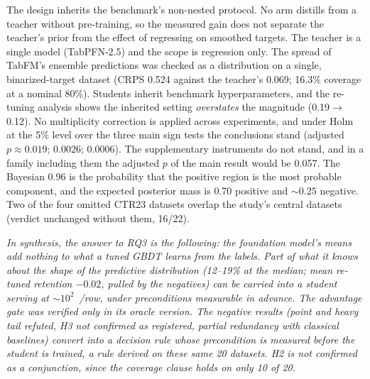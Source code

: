The design inherits the benchmark's non-nested protocol. No arm
distills from a teacher without pre-training, so the measured gain
does not separate the teacher's prior from the effect of regressing
on smoothed targets. The teacher is a single model (TabPFN-2.5) and
the scope is regression only. The spread of TabFM's ensemble
predictions was checked as a distribution on a single,
binarized-target dataset (CRPS 0.524 against the teacher's 0.069;
16.3\% coverage at a nominal 80\%). Students inherit benchmark
hyperparameters, and the re-tuning analysis shows the inherited
setting \emph{overstates} the magnitude (0.19$\to$0.12). No
multiplicity correction is applied across experiments, and under Holm at
the 5\% level over the three main sign tests the conclusions stand
(adjusted $p \approx 0.019$; $0.0026$; $0.0006$). The supplementary instruments do not stand, and in a family including them the adjusted $p$
of the main result would be 0.057. The Bayesian 0.96 is the
probability that the positive region is the most probable component,
and the expected posterior mass is 0.70 positive and ${\sim}0.25$
negative. Two of the four omitted CTR23 datasets overlap the study's
central datasets (verdict unchanged without them, 16/22).

\emph{In synthesis, the answer to RQ3 is the following: the foundation model's means add nothing to what a tuned GBDT learns from the labels. Part of what it knows about the shape of the predictive
distribution (12--19\% at the median; mean re-tuned retention
$-0.02$, pulled by the negatives) can be carried into a student
serving at ${\sim}10^2$~\us/row, under preconditions measurable in
advance. The advantage gate was verified only in its oracle
version. The negative results (point and heavy tail refuted, H3 not
confirmed as registered, partial redundancy with classical
baselines) convert into a decision rule whose precondition is
measured before the student is trained, a rule derived on
these same 20 datasets. H2 is not confirmed as a
conjunction, since the coverage clause holds on only 10 of 20.}
